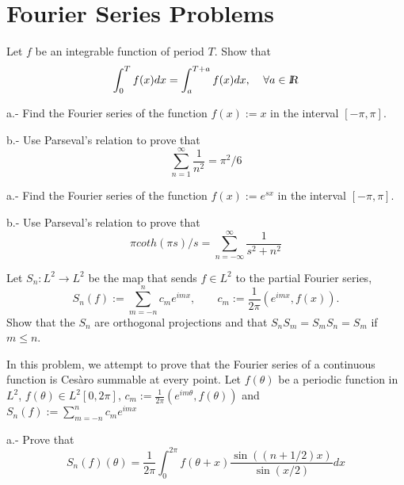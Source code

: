 
\section{Fourier Series Problems}

\bpro
Let $f$ be an integrable function of period $T$. Show that
\begin{equation}
  \int_0^T f(x)dx = \int_a^{T+a} f(x)dx, \;\;\;\; \forall a \in \mbox{\sl {l$\!\!\!\;\:\!$R}}
\end{equation}
\epro


\bpro
\espa
a.- Find the Fourier series of the function $f(x) := x$ in the
interval $[-\pi,\pi]$.

b.- Use Parseval's relation to prove that 
\begin{equation}
  \sum_{n=1}^{\infty} \frac{1}{n^2} = \pi^2/6
\end{equation}

\epro

\bpro
\espa
a.- Find the Fourier series of the function $f(x):= e^{sx}$ in the
interval $[-\pi, \pi]$.

b.- Use Parseval's relation to prove that 
\begin{equation}
  \pi coth(\pi s)/s = \sum_{n=-\infty}^{\infty} \frac{1}{s^2+n^2}
\end{equation}
\epro

\bpro
Let $S_n: L^2 \to L^2$ be the map that sends $f \in L^2$ to the partial
Fourier series,
\begin{equation}
  S_n(f) := \sum_{m=-n}^{n} c_m e^{imx}, \;\;\;\;\;\;\; 
                 c_m:= \frac{1}{2\pi}(e^{imx},f(x)).
\end{equation}
%
Show that the $S_n$ are orthogonal projections and that 
$S_n S_m = S_m S_n = S_m$ if $m \leq n$.
\epro

\bpro
In this problem, we attempt to prove that the Fourier series of
a continuous function is Cesàro summable at every point.
Let $f(\theta)$ be a periodic function in $L^2$, 
$f(\theta) \in L^2[0,2\pi]$,
$c_m:= \frac{1}{2\pi}(e^{im\theta},f(\theta))$
and \\
$ S_n(f) := \sum_{m=-n}^{n} c_m e^{imx}$

a.- Prove that 
\begin{equation}
  S_n(f)(\theta) = \frac{1}{2\pi} \int_0^{2\pi} f(\theta + x) 
                      \frac{\sin((n+1/2)x)}{\sin(x/2)} dx
\end{equation}

